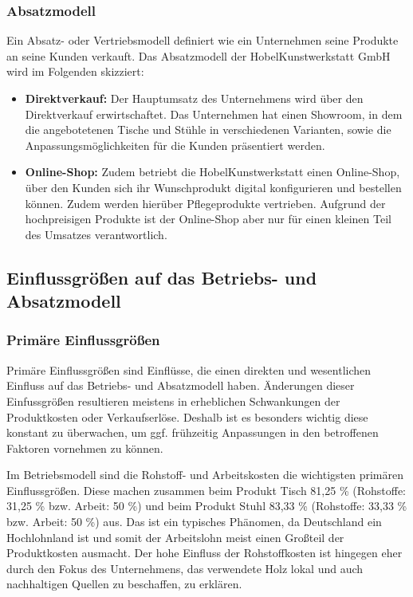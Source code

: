 \subsubsection{Absatzmodell}

Ein Absatz- oder Vertriebsmodell definiert wie ein Unternehmen seine Produkte an seine Kunden verkauft. Das Absatzmodell der HobelKunstwerkstatt GmbH wird im Folgenden skizziert:

\begin{itemize}
    \item \textbf{Direktverkauf:} Der Hauptumsatz des Unternehmens wird über den Direktverkauf erwirtschaftet. Das Unternehmen hat einen Showroom, in dem die angebotetenen Tische und Stühle in verschiedenen Varianten, sowie die Anpassungsmöglichkeiten für die Kunden präsentiert werden.
    \item \textbf{Online-Shop:} Zudem betriebt die HobelKunstwerkstatt einen Online-Shop, über den Kunden sich ihr Wunschprodukt digital konfigurieren und bestellen können. Zudem werden hierüber Pflegeprodukte vertrieben. Aufgrund der hochpreisigen Produkte ist der Online-Shop aber nur für einen kleinen Teil des Umsatzes verantwortlich.
\end{itemize}

\subsection{Einflussgrö{\ss}en auf das Betriebs- und Absatzmodell}

\subsubsection{Primäre Einflussgrö{\ss}en}

Primäre Einflussgrö{\ss}en sind Einflüsse, die einen direkten und wesentlichen Einfluss auf das Betriebs- und Absatzmodell haben. Änderungen dieser Einfussgrö{\ss}en resultieren meistens in erheblichen Schwankungen \zB der Produktkosten oder Verkaufserlöse. Deshalb ist es besonders wichtig diese konstant zu überwachen, um ggf. frühzeitig Anpassungen in den betroffenen Faktoren vornehmen zu können.

Im Betriebsmodell sind die Rohstoff- und Arbeitskosten die wichtigsten primären Einflussgrö{\ss}en. Diese machen zusammen beim Produkt Tisch 81,25 \% (Rohstoffe: 31,25 \% bzw. Arbeit: 50 \%) und beim Produkt Stuhl 83,33 \% (Rohstoffe: 33,33 \% bzw. Arbeit: 50 \%) aus. Das ist ein typisches Phänomen, da Deutschland ein Hochlohnland ist und somit der Arbeitslohn meist einen Gro{\ss}teil der Produktkosten ausmacht. Der hohe Einfluss der Rohstoffkosten ist hingegen eher durch den Fokus des Unternehmens, das verwendete Holz lokal und auch nachhaltigen Quellen zu beschaffen, zu erklären.

